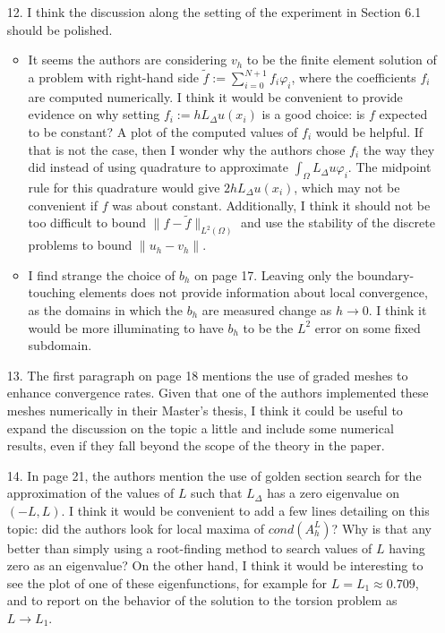 \documentclass[11 pt]{article}
\numberwithin{equation}{section}
\def\tilde{\widetilde}
\begin{document}
\begin{enumerate}
    \item[12.] I think the discussion along the setting of the experiment in Section 6.1 should be polished.
    \begin{itemize}
        \item It seems the authors are considering \(v_{h}\) to be the finite element solution of a problem with right-hand side \(\tilde{f}:=\sum_{i=0}^{N+1}f_{i}\varphi_{i}\), where the coefficients \(f_{i}\) are computed numerically. I think it would be convenient to provide evidence on why setting \(f_{i}:=hL_{\Delta}u(x_{i})\) is a good choice: is \(f\) expected to be constant? A plot of the computed values of \(f_{i}\) would be helpful. If that is not the case, then I wonder why the authors chose \(f_{i}\) the way they did instead of using quadrature to approximate \(\int_{\Omega}L_{\Delta}u\varphi_{i}\). The midpoint rule for this quadrature would give \(2hL_{\Delta}u(x_{i})\), which may not be convenient if \(f\) was about constant. Additionally, I think it should not be too difficult to bound \(\|f-\tilde{f}\|_{L^{2}(\Omega)}\) and use the stability of the discrete problems to bound \(\|u_{h}-v_{h}\|\).
        \item I find strange the choice of \(b_{h}\) on page 17. Leaving only the boundary-touching elements does not provide information about local convergence, as the domains in which the \(b_{h}\) are measured change as \(h\to 0\). I think it would be more illuminating to have \(b_{h}\) to be the \(L^{2}\) error on some fixed subdomain.
    \end{itemize}

    \item[13.] The first paragraph on page 18 mentions the use of graded meshes to enhance convergence rates. Given that one of the authors implemented these meshes numerically in their Master's thesis, I think it could be useful to expand the discussion on the topic a little and include some numerical results, even if they fall beyond the scope of the theory in the paper.

    \item[14.] In page 21, the authors mention the use of golden section search for the approximation of the values of \(L\) such that \(L_{\Delta}\) has a zero eigenvalue on \((-L,L)\). I think it would be convenient to add a few lines detailing on this topic: did the authors look for local maxima of \(cond(A_{h}^{L})\)? Why is that any better than simply using a root-finding method to search values of \(L\) having zero as an eigenvalue? On the other hand, I think it would be interesting to see the plot of one of these eigenfunctions, for example for \(L=L_{1}\approx 0.709\), and to report on the behavior of the solution to the torsion problem as \(L\to L_{1}\).
\end{enumerate}
\end{document}
